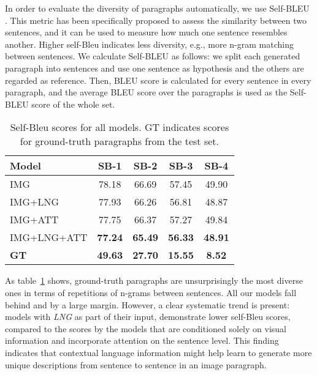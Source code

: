 \documentclass[11pt,a4paper]{article}
\begin{document}
In order to evaluate the diversity of paragraphs automatically, we use Self-BLEU \cite{Zhu2018selfbleu}.
This metric has been specifically proposed to assess the similarity between two sentences, and it can be used to measure how much one sentence resembles another.
Higher self-Bleu indicates less diversity, e.g., more n-gram matching between sentences.
We calculate Self-BLEU as follows: we split each generated paragraph into sentences and use one sentence as hypothesis and the others are regarded as reference.
Then, BLEU score is calculated for every sentence in every paragraph, and the average BLEU score over the paragraphs is used as the Self-BLEU score of the whole set.

\begin{table}[h]
    \footnotesize
    \centering
    \begin{tabular}{|l|c|c|c|c|}
    \hline
       \textbf{Model}  &  \textbf{SB-1} & \textbf{SB-2} & \textbf{SB-3} & \textbf{SB-4} \\
    \hline
      IMG   & 78.18 & 66.69 & 57.45 & 49.90 \\
    \hline
      IMG+LNG   & 77.93 & 66.26 & 56.81 & 48.87 \\
    \hline
      IMG+ATT   & 77.75 & 66.37 & 57.27 & 49.84 \\
    \hline
      IMG+LNG+ATT   & \textbf{77.24} & \textbf{65.49} & \textbf{56.33} & \textbf{48.91} \\
    \hline
    \hline
      \textbf{GT}   & \textbf{49.63} & \textbf{27.70} & \textbf{15.55} & \textbf{8.52} \\
     \hline
    \end{tabular}
    \caption{Self-Bleu scores for all models. GT indicates scores for ground-truth paragraphs from the test set.}
    \label{tab:self_bleu}
\end{table}

As table~\ref{tab:self_bleu} shows, ground-truth paragraphs are unsurprisingly the most diverse ones in terms of repetitions of n-grams between sentences.
All our models fall behind and by a large margin.
However, a clear systematic trend is present: models with \textit{LNG} as part of their input, demonstrate lower self-Bleu scores, compared to the scores by the models that are conditioned solely on visual information and incorporate attention on the sentence level.
This finding indicates that contextual language information might help learn to generate more unique descriptions from sentence to sentence in an image paragraph.
\end{document}
